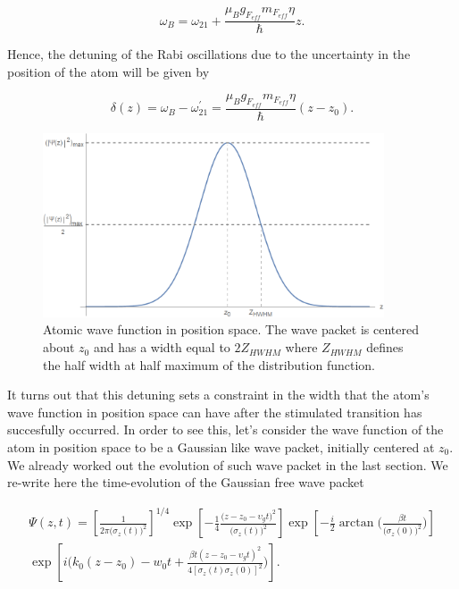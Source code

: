 \documentclass{article}
\begin{document}
\begin{equation}
  \omega_{B} =  \omega_{21} + \frac{\mu_{B} g_{F_{eff}} m_{F_{eff}} \eta}{\hbar} z.
\end{equation}

Hence, the detuning of the Rabi oscillations due to the uncertainty in the position of the atom will be given by

\begin{equation}\label{detunig_atom_width}
  \delta (z) = \omega_{B} - \omega_{21}^{\prime} = \frac{\mu_{B} g_{F_{eff}} m_{F_{eff}} \eta}{\hbar} (z-z_{0}).
\end{equation}

\begin{figure}
\centering
\includegraphics[width=0.9\textwidth]{atom_wave_func_pos_space.png}
\caption{Atomic wave function in position space. The wave packet is centered about $z_{0}$ and has a width equal to $2Z_{HWHM}$ where $Z_{HWHM}$ defines the half width at half maximum of the distribution function.}
\label{atom_wave_func_pos_space}
\end{figure}

It turns out that this detuning sets a constraint in the width that the atom's wave function in position space can have after the stimulated transition has succesfully occurred. In order to see this, let's consider the wave function of the atom in position space to be a Gaussian like wave packet, initially centered at $z_{0}$. We already worked out the evolution of such wave packet in the last section. We re-write here the time-evolution of the Gaussian free wave packet

\begin{multline}\label{atom_wave_function_position_space}
    \Psi (z, t) = \left[\frac{1}{2 \pi \big(\sigma_{z}(t)\big)^2} \right]^{1/4} \exp \left[-\frac{1}{4} \frac{ \big(z - z_{0} - \upsilon_{g} t \big)^{2}}{\big(\sigma_{z}(t)\big)^{2}} \right] \exp \left[-\frac{i}{2} \arctan\Bigg(\frac{\beta t }{\big(\sigma_{z}(0)\big)^{2}}\Bigg) \right] \\ \exp \left[i \bigg(k_{0}(z-z_{0}) - w_{0}t + \frac{ \beta t (z - z_{0} - \upsilon_{g} t)^{2}}{ 4[\sigma_{z}(t)\sigma_{z}(0)]^{2}} \bigg) \right].
\end{multline}
\end{document}
